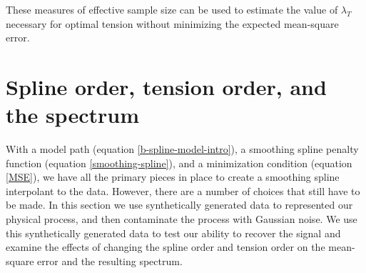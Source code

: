 \documentclass[10pt,journal]{IEEEtran}
\begin{document}
These measures of effective sample size can be used to estimate the value of $\lambda_T$ necessary for optimal tension without minimizing the expected mean-square error. 



%
\section{Spline order, tension order, and the spectrum} \label{sec:spline_order_tension_order_spectrum}
%

With a model path (equation \ref{b-spline-model-intro}), a smoothing spline penalty function (equation \ref{smoothing-spline}), and a minimization condition (equation \ref{MSE}), we have all the primary pieces in place to create a smoothing spline interpolant to the data. However, there are a number of choices that still have to be made. In this section we use synthetically generated data to represented our physical process, and then contaminate the process with Gaussian noise. We use this synthetically generated data to test our ability to recover the signal and examine the effects of changing the spline order and tension order on the mean-square error and the resulting spectrum.
\end{document}
